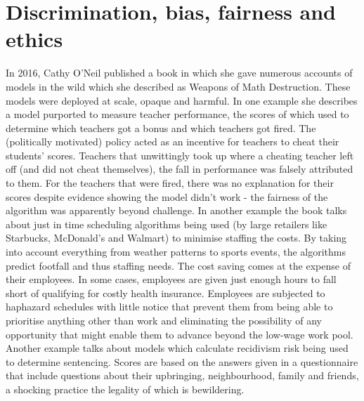 \section{Discrimination, bias, fairness and ethics}

In 2016, Cathy O'Neil published a book in which she gave numerous accounts of models in the wild which she described as Weapons of Math Destruction. These models were deployed at scale, opaque and harmful. In one example she describes a model purported to measure teacher performance, the scores of which used to determine which teachers got a bonus and which teachers got fired. The (politically motivated) policy acted as an incentive for teachers to cheat their students' scores. Teachers that unwittingly took up where a cheating teacher left off (and did not cheat themselves), the fall in performance was falsely attributed to them. For the teachers that were fired, there was no explanation for their scores despite evidence showing the model didn't work - the fairness of the algorithm was apparently beyond challenge. In another example the book talks about just in time scheduling algorithms being used (by large retailers like Starbucks, McDonald's and Walmart) to minimise staffing the costs. By taking into account everything from weather patterns to sports events, the algorithms predict footfall and thus staffing needs. The cost saving comes at the expense of their employees. In some cases, employees are given just enough hours to fall short of qualifying for costly health insurance. Employees are subjected to haphazard schedules with little notice that prevent them from being able to prioritise anything other than work and eliminating the possibility of any opportunity that might enable them to advance beyond the low-wage work pool. Another example talks about models which calculate recidivism risk being used to determine sentencing. Scores are based on the answers given in a questionnaire that include questions about their upbringing, neighbourhood, family and friends, a shocking practice the legality of which is bewildering.

